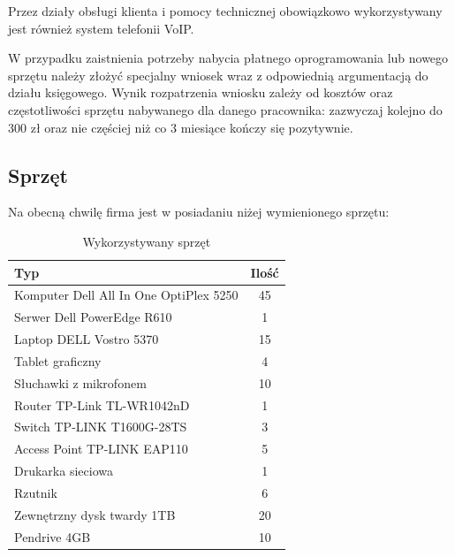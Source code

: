 \documentclass{article}
\begin{document}
        Przez działy obsługi klienta i pomocy technicznej obowiązkowo wykorzystywany jest również system telefonii VoIP.

        W przypadku zaistnienia potrzeby nabycia płatnego oprogramowania lub nowego sprzętu należy złożyć specjalny wniosek wraz z odpowiednią argumentacją do działu księgowego. Wynik rozpatrzenia wniosku zależy od kosztów oraz częstotliwości sprzętu nabywanego dla danego pracownika: zazwyczaj kolejno do 300 zł oraz nie częściej niż co 3 miesiące kończy się pozytywnie.
        \subsection{Sprzęt}
            Na obecną chwilę firma jest w posiadaniu niżej wymienionego sprzętu:
            \begin{table}[H]
                \centering
                \begin{tabular}{ | l | c | }
                    \hline
                    \textbf{Typ} & \textbf{Ilość} \\
                    \hline
                    Komputer Dell All In One OptiPlex 5250 & 45 \\
                    \hline
                    Serwer Dell PowerEdge R610 & 1 \\
                    \hline
                    Laptop DELL Vostro 5370 & 15 \\
                    \hline
                    Tablet graficzny & 4 \\
                    \hline
                    Słuchawki z mikrofonem & 10 \\
                    \hline
                    Router TP-Link TL-WR1042nD & 1 \\
                    \hline
                    Switch TP-LINK T1600G-28TS & 3 \\
                    \hline
                    Access Point TP-LINK EAP110 & 5 \\
                    \hline
                    Drukarka sieciowa & 1 \\
                    \hline
                    Rzutnik & 6 \\
                    \hline
                    Zewnętrzny dysk twardy 1TB & 20 \\
                    \hline
                    Pendrive 4GB & 10 \\
                    \hline
                \end{tabular}
                \caption{Wykorzystywany sprzęt}
            \end{table}
\end{document}
